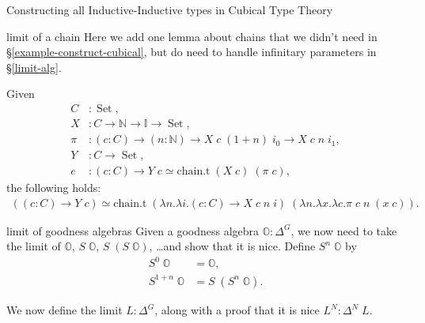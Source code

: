 \documentclass[acmsmall,review]{acmart}\settopmatter{printfolios=true,printccs=false,printacmref=false}
\DeclareMathOperator{\USet}{Set}
\newcommand{\N}{\mathbb{N}}
\newcommand{\I}{\mathbb{I}}
\newcommand{\bbO}{\mathbb{O}}
\begin{document}
\begin{section}{Constructing all Inductive-Inductive types in Cubical Type Theory}
\begin{subsection}{limit of a chain}
Here we add one lemma about chains that we didn't need in \S\ref{example-construct-cubical}, but do need to handle infinitary parameters in \S\ref{limit-alg}.

\begin{lemma}
    Given \begin{align*}
    C &: \USet,\\
    X &: C \to \N \to \I \to \USet,\\
    \pi &: (c : C) \to (n : \N) \to X\;c\;(1+n)\;i_0 \to X\;c\;n\;i_1,\\
    Y &: C \to \USet,\\
    e &: (c : C) \to Y\;c \simeq \text{chain.t}\;(X\;c)\;(\pi\;c),
    \end{align*}
    the following holds:
    \begin{gather*}
    ((c : C) \to Y\;c) \simeq \text{chain.t}\;(\lambda n.\lambda i.(c : C) \to X\;c\;n\;i)\;(\lambda n.\lambda x.\lambda c. \pi\;c\;n\;(x\;c)).
    \end{gather*}
\end{lemma}

\end{subsection}
\begin{subsection}{limit of goodness algebras}\label{limit-alg}
Given a goodness algebra $\bbO : \Delta^G$, we now need to take the limit of $\bbO$, $S\;\bbO$, $S\;(S\;\bbO)$, \dots and show that it is nice.
Define $S^n\;\bbO$ by \begin{align*}S^0\;\bbO &= \bbO,\\ S^{1+n}\;\bbO &= S\;(S^n\;\bbO).\end{align*}

We now define the limit $L : \Delta^G$, along with a proof that it is nice $L^N : \Delta^N\;L$.


\end{subsection}
\end{section}
\end{document}
